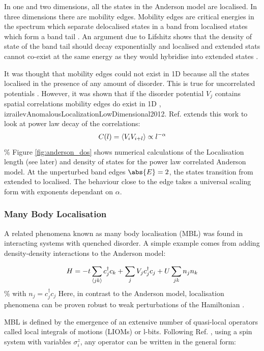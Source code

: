 In one and two dimensions, all the states in the Anderson model are localised. In three dimensions there are mobility edges. Mobility edges are critical energies in the spectrum which separate delocalised states in a band from localised states which form a band tail \textcite{abaninRecentProgressManybody2017}. An argument due to Lifshitz shows that the density of state of the band tail should decay exponentially and localised and extended stats cannot co-exist at the same energy as they would hybridise into extended states \textcite{kramerLocalizationTheoryExperiment1993}.

It was thought that mobility edges could not exist in 1D because all the states localised in the presence of any amount of disorder. This is true for uncorrelated potentials \textcite{goldshteinPurePointSpectrum1977}. However, it was shown that if the disorder potential \(V_j\) contains spatial correlations mobility edges do exist in 1D \textcite{izrailevLocalizationMobilityEdge1999}, izrailevAnomalousLocalizationLowDimensional2012. Ref. \textcite{croyAndersonLocalization1D2011} extends this work to look at power law decay of the correlations: \[ C(l) = \langle V_i V_{i+l} \rangle \propto l^{-\alpha} \] \% Figure \ref{fig:anderson_dos} shows numerical calculations of the Localisation length (see later) and density of states for the power law correlated Anderson model. At the unperturbed band edges \(\abs{E} = 2\), the states transition from extended to localised. The behaviour close to the edge takes a universal scaling form with exponents dependant on \(\alpha\).

\hypertarget{many-body-localisation}{%
\subsubsection{Many Body Localisation}\label{many-body-localisation}}

A related phenomena known as many body localisation (MBL) was found in interacting systems with quenched disorder. A simple example comes from adding density-density interactions to the Anderson model:

\[
H = -t\sum_{\langle jk \rangle} c^\dagger_j c_k + \sum_j V_j c_j^\dagger c_j + U\sum_{jk} n_j n_k
\] \% with \(n_j = c^\dagger_j c_j\) Here, in contrast to the Anderson model, localisation phenomena can be proven robust to weak perturbations of the Hamiltonian \textcite{imbrieManyBodyLocalizationQuantum2016}.

MBL is defined by the emergence of an extensive number of quasi-local operators called local integrals of motions (LIOMs) or l-bits. Following Ref. \textcite{abaninRecentProgressManybody2017}, using a spin system with variables \(\sigma^z_i\), any operator can be written in the general form:

